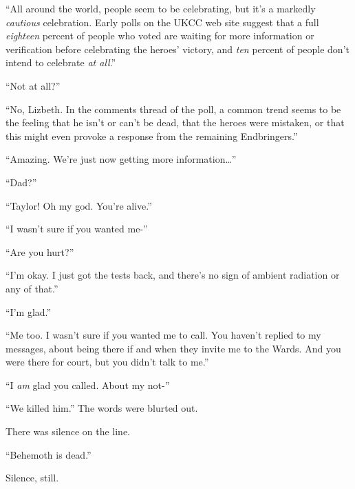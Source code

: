 ``All around the world, people seem to be celebrating, but it's a markedly \emph{cautious} celebration.  Early polls on the UKCC web site suggest that a full \emph{eighteen} percent of people who voted are waiting for more information or verification before celebrating the heroes' victory, and \emph{ten} percent of people don't intend to celebrate \emph{at all}.''



``Not at all?''



``No, Lizbeth.  In the comments thread of the poll, a common trend seems to be the feeling that he isn't or can't be dead, that the heroes were mistaken, or that this might even provoke a response from the remaining Endbringers.''



``Amazing.  We're just now getting more information\ldots''



\blacksquare



``Dad?''



``Taylor!  Oh my god.  You're alive.''



``I wasn't sure if you wanted me-''



``Are you hurt?''



``I'm okay.  I just got the tests back, and there's no sign of ambient radiation or any of that.''



``I'm glad.''



``Me too.  I wasn't sure if you wanted me to call.  You haven't replied to my messages, about being there if and when they invite me to the Wards.  And you were there for court, but you didn't talk to me.''



``I \emph{am} glad you called.  About my not-''



``We killed him.''  The words were blurted out.



There was silence on the line.



``Behemoth is dead.''



Silence, still.



